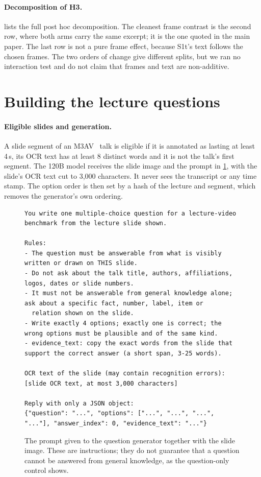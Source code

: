 \paragraph{Decomposition of H3.}
 lists the full post hoc decomposition.
The cleanest frame contrast is the second row, where both arms carry the same excerpt; it is the one quoted in the main paper.
The last row is not a pure frame effect, because S1t's text follows the chosen frames.
The two orders of change give different splits, but we ran no interaction test and do not claim that frames and text are non-additive.

\section{Building the lecture questions}
\label{sec:s-data}

\paragraph{Eligible slides and generation.}
A slide segment of an M3AV~\cite{chen2024m3av} talk is eligible if it is annotated as lasting at least 4\,s, its OCR text has at least 8 distinct words and it is not the talk's first segment.
The 120B model receives the slide image and the prompt in \cref{fig:s-prompt}, with the slide's OCR text cut to 3,000 characters.
It never sees the transcript or any time stamp.
The option order is then set by a hash of the lecture and segment, which removes the generator's own ordering.

\begin{figure}[t]
\centering
\begin{minipage}{0.94\textwidth}
\footnotesize
\begin{verbatim}
You write one multiple-choice question for a lecture-video benchmark from the lecture slide shown.

Rules:
- The question must be answerable from what is visibly written or drawn on THIS slide.
- Do not ask about the talk title, authors, affiliations, logos, dates or slide numbers.
- It must not be answerable from general knowledge alone; ask about a specific fact, number, label, item or
  relation shown on the slide.
- Write exactly 4 options; exactly one is correct; the wrong options must be plausible and of the same kind.
- evidence_text: copy the exact words from the slide that support the correct answer (a short span, 3-25 words).

OCR text of the slide (may contain recognition errors):
[slide OCR text, at most 3,000 characters]

Reply with only a JSON object:
{"question": "...", "options": ["...", "...", "...", "..."], "answer_index": 0, "evidence_text": "..."}
\end{verbatim}
\end{minipage}
\caption{The prompt given to the question generator together with the slide image. These are instructions; they do not guarantee that a question cannot be answered from general knowledge, as the question-only control shows.}
\label{fig:s-prompt}
\end{figure}

